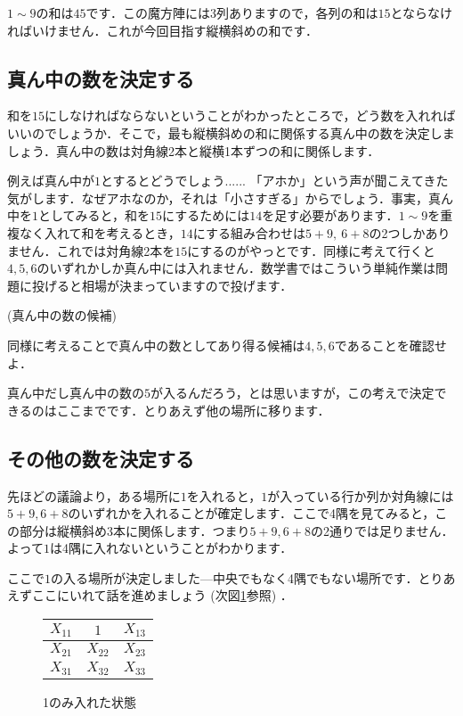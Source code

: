 \documentclass[11pt]{jsarticle}
\begin{document}
$1\sim 9$の和は$45$です．この魔方陣には$3$列ありますので，各列の和は$15$とならなければいけません．これが今回目指す縦横斜めの和です．

\subsection{真ん中の数を決定する}
和を$15$にしなければならないということがわかったところで，どう数を入れればいいのでしょうか．そこで，最も縦横斜めの和に関係する真ん中の数を決定しましょう．真ん中の数は対角線2本と縦横1本ずつの和に関係します．

例えば真ん中が$1$とするとどうでしょう...... 「アホか」という声が聞こえてきた気がします．なぜアホなのか，それは「小さすぎる」からでしょう．事実，真ん中を$1$としてみると，和を$15$にするためには$14$を足す必要があります．$1\sim 9$を重複なく入れて和を考えるとき，$14$にする組み合わせは$5+9,\ 6+8$の2つしかありません．これでは対角線2本を$15$にするのがやっとです．同様に考えて行くと$4,5,6$のいずれかしか真ん中には入れません．数学書ではこういう単純作業は問題に投げると相場が決まっていますので投げます．

\begin{screen}
\begin{prob} (真ん中の数の候補) 

  同様に考えることで真ん中の数としてあり得る候補は$4,5,6$であることを確認せよ．
\end{prob}
\end{screen}

真ん中だし真ん中の数の$5$が入るんだろう，とは思いますが，この考えで決定できるのはここまでです．とりあえず他の場所に移ります．

\subsection{その他の数を決定する}
先ほどの議論より，ある場所に$1$を入れると，$1$が入っている行か列か対角線には$5+9, 6+8$のいずれかを入れることが確定します．ここで4隅を見てみると，この部分は縦横斜め3本に関係します．つまり$5+9, 6+8$の2通りでは足りません．よって$1$は4隅に入れないということがわかります．

ここで$1$の入る場所が決定しました---中央でもなく4隅でもない場所です．とりあえずここにいれて話を進めましょう (次図\ref{only1}参照) ．

\begin{figure}[H]
  \centering
  \begin{tabular}{|c|c|c|}
    \hline
    $X_{11}$ & $1$ & $X_{13}$ \\ \hline
    $X_{21}$ & $X_{22}$ & $X_{23}$ \\ \hline
    $X_{31}$ & $X_{32}$ & $X_{33}$ \\ \hline
  \end{tabular}
  \caption{1のみ入れた状態}
  \label{only1}
\end{figure}
\end{document}

